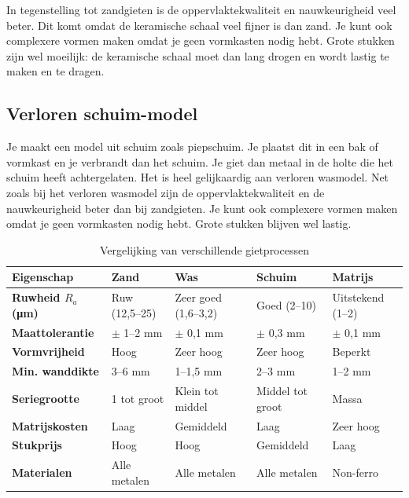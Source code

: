 \documentclass[a4paper,11pt,twoside]{report}
\begin{document}
In tegenstelling tot zandgieten is de oppervlaktekwaliteit en nauwkeurigheid veel beter.
Dit komt omdat de keramische schaal veel fijner is dan zand.
Je kunt ook complexere vormen maken omdat je geen vormkasten nodig hebt.
Grote stukken zijn wel moeilijk: de keramische schaal moet dan lang drogen en wordt lastig te maken en te dragen.


\subsection{Verloren schuim-model}
Je maakt een model uit schuim zoals piepschuim.
Je plaatst dit in een bak of vormkast en je verbrandt dan het schuim.
Je giet dan metaal in de holte die het schuim heeft achtergelaten.
Het is heel gelijkaardig aan verloren wasmodel.
Net zoals bij het verloren wasmodel zijn de oppervlaktekwaliteit en de nauwkeurigheid beter dan bij zandgieten.
Je kunt ook complexere vormen maken omdat je geen vormkasten nodig hebt.
Grote stukken blijven wel lastig.

\begin{table}[htbp]
    \centering
    \caption{Vergelijking van verschillende gietprocessen}
    \label{tab:gietprocessen}
    \small
    \renewcommand{\arraystretch}{1.1}
    \setlength{\tabcolsep}{4pt}
    \begin{tabularx}{\textwidth}{@{} >{\bfseries}l | X | X | X | X @{}}
        \toprule
        \textnormal{\textbf{Eigenschap}} & \textbf{Zand} & \textbf{Was}     & \textbf{Schuim}  & \textbf{Matrijs}  \\
        \midrule
        Ruwheid $R_a$ (\si{\micro m})    & Ruw (12,5--25) & Zeer goed (1,6--3,2) & Goed (2--10)     & Uitstekend (1--2) \\
        Maattolerantie                   & $\pm$ 1--2 mm & $\pm$ 0,1 mm     & $\pm$ 0,3 mm     & $\pm$ 0,1 mm      \\
        Vormvrijheid                     & Hoog          & Zeer hoog        & Zeer hoog        & Beperkt           \\
        Min. wanddikte                   & 3--6 mm       & 1--1,5 mm        & 2--3 mm          & 1--2 mm           \\
        Seriegrootte                     & 1 tot groot   & Klein tot middel & Middel tot groot & Massa             \\
        Matrijskosten                    & Laag          & Gemiddeld        & Laag             & Zeer hoog         \\
        Stukprijs                        & Hoog          & Hoog             & Gemiddeld        & Laag              \\
        Materialen                       & Alle metalen  & Alle metalen     & Alle metalen     & Non-ferro         \\
        \bottomrule
    \end{tabularx}
\end{table}
\end{document}
